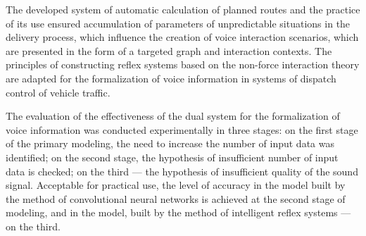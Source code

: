 
The developed system of automatic calculation of planned routes and the practice of its use ensured accumulation of parameters of unpredictable situations in the delivery process, which influence the creation of voice interaction scenarios, which are presented in the form of a targeted graph and interaction contexts.
The principles of constructing reflex systems based on the non-force interaction theory are adapted for the formalization of voice information in systems of dispatch control of vehicle traffic.


The evaluation of the effectiveness of the dual system for the formalization of voice information was conducted experimentally in three stages: on the first stage of the primary modeling, the need to increase the number of input data was identified; on the second stage, the hypothesis of insufficient number of input data is checked; on the third --- the hypothesis of insufficient quality of the sound signal. Acceptable for practical use, the level of accuracy in the model built by the method of convolutional neural networks is achieved at the second stage of modeling, and in the model, built by the method of intelligent reflex systems --- on the third.

